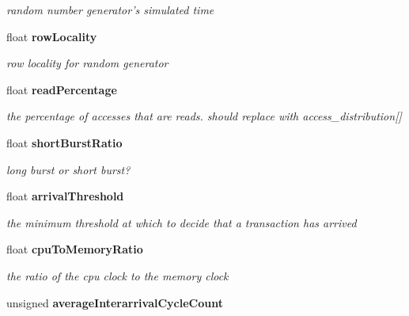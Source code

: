 \begin{DoxyCompactItemize}
\begin{DoxyCompactList}\small\item\em random number generator's simulated time \item\end{DoxyCompactList}\item 
float {\bf rowLocality}\label{class_d_r_a_msim_i_i_1_1_input_stream_a7e22f35612add8cca13d82dc6e19dafd}

\begin{DoxyCompactList}\small\item\em row locality for random generator \item\end{DoxyCompactList}\item 
float {\bf readPercentage}\label{class_d_r_a_msim_i_i_1_1_input_stream_a37863b3a3f7a96f6a9a8b5c673677c4c}

\begin{DoxyCompactList}\small\item\em the percentage of accesses that are reads. should replace with access\_\-distribution[] \item\end{DoxyCompactList}\item 
float {\bf shortBurstRatio}\label{class_d_r_a_msim_i_i_1_1_input_stream_adb181cfcc298b360c316c2398146f7e5}

\begin{DoxyCompactList}\small\item\em long burst or short burst? \item\end{DoxyCompactList}\item 
float {\bf arrivalThreshold}\label{class_d_r_a_msim_i_i_1_1_input_stream_a568a842c71aabd7c59ff440277989fa0}

\begin{DoxyCompactList}\small\item\em the minimum threshold at which to decide that a transaction has arrived \item\end{DoxyCompactList}\item 
float {\bf cpuToMemoryRatio}\label{class_d_r_a_msim_i_i_1_1_input_stream_a032d85a4a44d5160f9c7f7411f242307}

\begin{DoxyCompactList}\small\item\em the ratio of the cpu clock to the memory clock \item\end{DoxyCompactList}\item 
unsigned {\bf averageInterarrivalCycleCount}\label{class_d_r_a_msim_i_i_1_1_input_stream_a50ab206ccc66b560f4181d4c33e3c6d2}


\end{DoxyCompactItemize}
